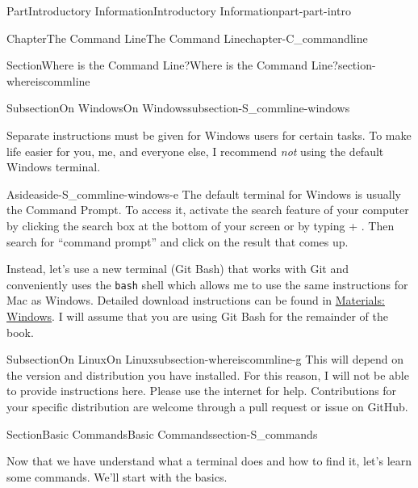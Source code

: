 \documentclass[oneside,10pt,]{book}
\newcommand{\mono}[1]{\texttt{#1}}
\newcommand{\kbd}[1]{\keys{{#1}}}
\begin{document}
\begin{partptx}{Part}{Introductory Information}{}{Introductory Information}{}{}{part-part-intro}
\begin{chapterptx}{Chapter}{The Command Line}{}{The Command Line}{}{}{chapter-C_commandline}
\begin{sectionptx}{Section}{Where is the Command Line?}{}{Where is the Command Line?}{}{}{section-whereiscommline}
\begin{subsectionptx}{Subsection}{On Windows}{}{On Windows}{}{}{subsection-S_commline-windows}
\par
Separate instructions must be given for Windows users for certain tasks. To make life easier for you, me, and everyone else, I recommend \emph{not} using the default Windows terminal.%
\begin{aside}{Aside}{}{aside-S_commline-windows-e}%
The default terminal for Windows is usually the Command Prompt. To access it, activate the search feature of your computer by clicking the search box at the bottom of your screen or by typing \kbd{Windows} + \kbd{S}. Then search for ``command prompt'' and click on the result that comes up.%
\end{aside}
Instead, let's use a new terminal (Git Bash) that works with Git and conveniently uses the \mono{bash} shell which allows me to use the same instructions for Mac as Windows. Detailed download instructions can be found in \hyperref[preface-materials-windows]{Materials: Windows}. I will assume that you are using Git Bash for the remainder of the book.%
\end{subsectionptx}
%
%
\typeout{************************************************}
\typeout{************************************************}
%
\begin{subsectionptx}{Subsection}{On Linux}{}{On Linux}{}{}{subsection-whereiscommline-g}
%
This will depend on the version and distribution you have installed. For this reason, I will not be able to provide instructions here. Please use the internet for help. Contributions for your specific distribution are welcome through a pull request or issue on GitHub.%
\end{subsectionptx}
\end{sectionptx}
%
%
\typeout{************************************************}
\typeout{************************************************}
%
\begin{sectionptx}{Section}{Basic Commands}{}{Basic Commands}{}{}{section-S_commands}
%
%
%
\begin{introduction}{}%
Now that we have understand what a terminal does and how to find it, let's learn some commands. We'll start with the basics.%
\end{introduction}%
%
%
\typeout{************************************************}
\typeout{************************************************}

\end{sectionptx}
\end{chapterptx}
\end{partptx}
\end{document}

